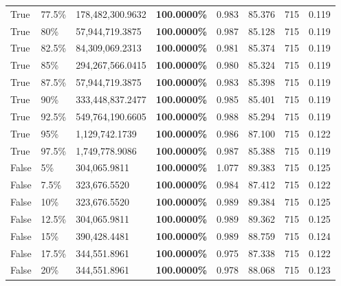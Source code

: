 \begin{table}[H]
\begin{tabular}{lllrllll}
\cline{1-8} \cline{2-8}
True & 77.5\% & 178,482,300.9632 & \bfseries \color{red} 100.0000\% & 0.983 & 85.376 & 715 & 0.119 \\
\cline{1-8} \cline{2-8}
True & 80\% & 57,944,719.3875 & \bfseries \color{red} 100.0000\% & 0.987 & 85.128 & 715 & 0.119 \\
\cline{1-8} \cline{2-8}
True & 82.5\% & 84,309,069.2313 & \bfseries \color{red} 100.0000\% & 0.981 & 85.374 & 715 & 0.119 \\
\cline{1-8} \cline{2-8}
True & 85\% & 294,267,566.0415 & \bfseries \color{red} 100.0000\% & 0.980 & 85.324 & 715 & 0.119 \\
\cline{1-8} \cline{2-8}
True & 87.5\% & 57,944,719.3875 & \bfseries \color{red} 100.0000\% & 0.983 & 85.398 & 715 & 0.119 \\
\cline{1-8} \cline{2-8}
True & 90\% & 333,448,837.2477 & \bfseries \color{red} 100.0000\% & 0.985 & 85.401 & 715 & 0.119 \\
\cline{1-8} \cline{2-8}
True & 92.5\% & 549,764,190.6605 & \bfseries \color{red} 100.0000\% & 0.988 & 85.294 & 715 & 0.119 \\
\cline{1-8} \cline{2-8}
True & 95\% & 1,129,742.1739 & \bfseries \color{red} 100.0000\% & 0.986 & 87.100 & 715 & 0.122 \\
\cline{1-8} \cline{2-8}
True & 97.5\% & 1,749,778.9086 & \bfseries \color{red} 100.0000\% & 0.987 & 85.388 & 715 & 0.119 \\
\cline{1-8} \cline{2-8}
False & 5\% & \color{red} 304,065.9811 & \bfseries \color{red} 100.0000\% & 1.077 & 89.383 & 715 & 0.125 \\
\cline{1-8} \cline{2-8}
False & 7.5\% & 323,676.5520 & \bfseries \color{red} 100.0000\% & 0.984 & 87.412 & 715 & 0.122 \\
\cline{1-8} \cline{2-8}
False & 10\% & 323,676.5520 & \bfseries \color{red} 100.0000\% & 0.989 & 89.384 & 715 & 0.125 \\
\cline{1-8} \cline{2-8}
False & 12.5\% & \color{red} 304,065.9811 & \bfseries \color{red} 100.0000\% & 0.989 & 89.362 & 715 & 0.125 \\
\cline{1-8} \cline{2-8}
False & 15\% & 390,428.4481 & \bfseries \color{red} 100.0000\% & 0.989 & 88.759 & 715 & 0.124 \\
\cline{1-8} \cline{2-8}
False & 17.5\% & 344,551.8961 & \bfseries \color{red} 100.0000\% & 0.975 & 87.338 & 715 & 0.122 \\
\cline{1-8} \cline{2-8}
False & 20\% & 344,551.8961 & \bfseries \color{red} 100.0000\% & 0.978 & 88.068 & 715 & 0.123 \\

\end{tabular}
\end{table}
